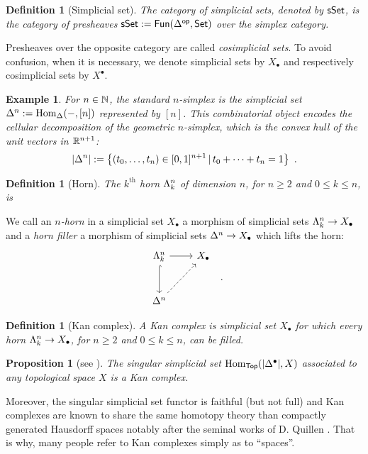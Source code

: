 \documentclass[twoside, 10pt]{amsart}
\newtheorem{example}[lemma]{Example}
\newtheorem{definition}[lemma]{Definition}
\newtheorem{proposition}[lemma]{Proposition}
\begin{document}
\begin{definition}[Simplicial set]
The category of \emph{simplicial sets}, denoted by $\sSe$, is the category of presheaves 
$\sSe:=\mathsf{Fun(}\cD^\mathsf{op}, \mathsf{Set)}$
over the simplex category. 
\end{definition}

Presheaves over the opposite category are called \emph{cosimplicial sets}. To avoid confusion, when it is necessary, we denote simplicial sets by $X_\bullet$ and respectively cosimplicial sets by $X^\bullet$. 

\begin{example}
For $n\in \NN$, the \emph{standard $n$-simplex} is the simplicial set 
$\De{n}:=\Hom_{\cD}(-,[n])$ represented by $[n]$. This combinatorial object encodes the cellular decomposition of the \emph{geometric $n$-simplex}, which is the convex hull of the unit vectors in $\RR^{n+1}$:
\[|\De{n}|:=\left\{
(t_0, \ldots, t_n) \in [0,1]^{n+1}\, | \, t_0+\cdots+t_n=1
\right\} \ .\]
\end{example}

\begin{definition}[Horn]
The \emph{$k^{\text{th}}$ horn $\Ho{k}{n}$ of dimension $n$}, for $n\geqslant 2$ and $0\leqslant k \leqslant n$, is 
\end{definition}

We call an \emph{$n$-horn} in a simplicial set $X_\bullet$ a morphism of simplicial sets 
$\Ho{k}{n}\to X_\bullet$ and a \emph{horn filler} a morphism of simplicial sets $\De{n}\to X_\bullet$ which lifts the horn:
\[
\vcenter{\hbox{
\begin{tikzcd}[column sep=0.8cm, row sep=1cm]
\Ho{k}{n}
\arrow[d, hookrightarrow]
\arrow[r]
& X_\bullet
\\
\De{n} \arrow[ur, dashrightarrow] 
&\end{tikzcd}
}}\ .
\]

\begin{definition}[Kan complex]
A \emph{Kan complex} is simplicial set $X_\bullet$ for which every horn $\Ho{k}{n}\to X_\bullet$, for $n\geqslant 2$ and $0\leqslant k \leqslant n$, can be filled.
\end{definition}

\begin{proposition}[{see \cite[Lemma~3.3]{GoerssJardine09}}]
The singular simplicial set $\Hom_{\mathsf{Top}}(|\De{\bullet}|, X)$ associated to any topological space $X$ is a Kan complex.
\end{proposition}
 Moreover, the singular simplicial set functor is faithful (but not full) and Kan complexes are known to share the same homotopy theory than compactly generated Hausdorff spaces notably after the seminal works of D. Quillen \cite{Quillen67}. 
That is why, many people refer to Kan complexes simply as to ``spaces''. 
\end{document}
